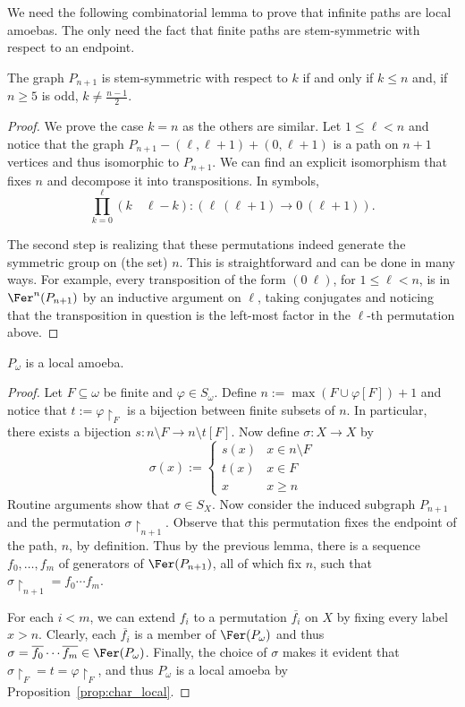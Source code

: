 \documentclass[12pt]{article}
\begin{document}
We need the following combinatorial lemma to prove that infinite paths are local amoebas.
The only need the fact that finite paths are stem-symmetric with respect to an endpoint.

\begin{lemma}
    The graph $P_{n+1}$ is stem-symmetric with respect to $k$ if and only if $k\leq n$ and, if $n\geq5$ is odd, $k\neq\frac{n-1}2$.
\end{lemma}

\begin{proof}
    We prove the case $k=n$ as the others are similar.
    Let $1\leq\ell<n$ and notice that the graph $P_{n+1}-(\ell,\ell+1)+(0,\ell+1)$ is a path on $n+1$ vertices and thus isomorphic to $P_{n+1}$.
    We can find an explicit isomorphism that fixes $n$ and decompose it into transpositions.
    In symbols, $$\prod_{k=0}^\ell(k\quad\ell-k):(\ell\ (\ell+1)\to0\ (\ell+1)).$$
    
    The second step is realizing that these permutations indeed generate the symmetric group on (the set) $n$.
    This is straightforward and can be done in many ways. For example, every transposition of the form $(0\ \ell)$, for $1\leq\ell<n$, is in $\Fer^n(P_{n+1})$ by an inductive argument on $\ell$, taking conjugates and noticing that the transposition in question is the left-most factor in the $\ell$-th permutation above.
\end{proof}

\begin{proposition}
    $P_\omega$ is a local amoeba.
\end{proposition}

\begin{proof}
    Let $F\subseteq\omega$ be finite and $\varphi\in S_\omega$.
    Define $n:=\max(F\cup\varphi[F])+1$ and notice that $t:=\varphi\restriction_F$ is a bijection between finite subsets of $n$.
    In particular, there exists a bijection $s:n\setminus F\to n\setminus t[F]$.
    Now define $\sigma:X\to X$ by $$\sigma(x):=\begin{cases}
        s(x)&x\in n\setminus F\\
        t(x)&x\in F\\
        x&x\geq n
    \end{cases}$$ Routine arguments show that $\sigma\in S_X$.
    Now consider the induced subgraph $P_{n+1}$ and the permutation $\sigma\restriction_{n+1}$.
    Observe that this permutation fixes the endpoint of the path, $n$, by definition.
    Thus by the previous lemma, there is a sequence $f_0,\dots,f_m$ of generators of $\Fer(P_{n+1})$, all of which fix $n$, such that $\sigma\restriction_{n+1}=f_0\cdots f_m$.

    For each $i<m$, we can extend $f_i$ to a permutation $\overline{f_i}$ on $X$ by fixing every label $x>n$.
    Clearly, each $\overline{f_i}$ is a member of $\Fer(P_\omega)$ and thus $\sigma=\overline{f_0}\cdots\overline{f_m}\in\Fer(P_\omega)$. 
    Finally, the choice of $\sigma$ makes it evident that $\sigma\restriction_F=t=\varphi\restriction_F$, and thus $P_\omega$ is a local amoeba by Proposition~\ref{prop:char_local}.
\end{proof}
\end{document}
